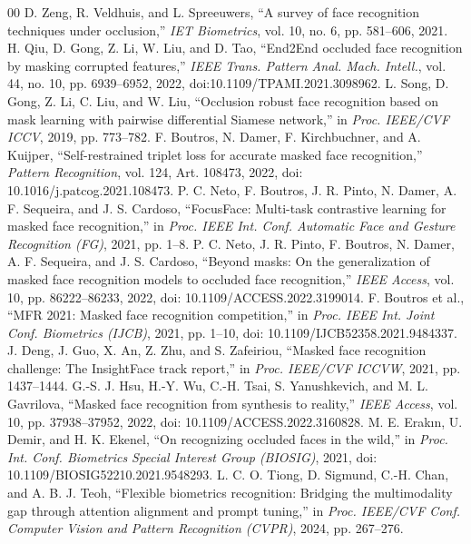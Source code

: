 \documentclass[12pt,a4paper,oneside]{report}
\begin{document}
\begin{thebibliography}{00}
 D. Zeng, R. Veldhuis, and L. Spreeuwers, ``A survey of face recognition techniques under occlusion,'' \textit{IET Biometrics}, vol. 10, no. 6, pp. 581--606, 2021.
 H. Qiu, D. Gong, Z. Li, W. Liu, and D. Tao, ``End2End occluded face recognition by masking corrupted features,'' \textit{IEEE Trans. Pattern Anal. Mach. Intell.}, vol. 44, no. 10, pp. 6939--6952, 2022, doi:10.1109/TPAMI.2021.3098962.
 L. Song, D. Gong, Z. Li, C. Liu, and W. Liu, ``Occlusion robust face recognition based on mask learning with pairwise differential Siamese network,'' in \textit{Proc. IEEE/CVF ICCV}, 2019, pp. 773--782.
 F. Boutros, N. Damer, F. Kirchbuchner, and A. Kuijper, ``Self-restrained triplet loss for accurate masked face recognition,'' \textit{Pattern Recognition}, vol. 124, Art. 108473, 2022, doi: 10.1016/j.patcog.2021.108473.
 P. C. Neto, F. Boutros, J. R. Pinto, N. Damer, A. F. Sequeira, and J. S. Cardoso, ``FocusFace: Multi-task contrastive learning for masked face recognition,'' in \textit{Proc. IEEE Int. Conf. Automatic Face and Gesture Recognition (FG)}, 2021, pp. 1--8.
 P. C. Neto, J. R. Pinto, F. Boutros, N. Damer, A. F. Sequeira, and J. S. Cardoso, ``Beyond masks: On the generalization of masked face recognition models to occluded face recognition,'' \textit{IEEE Access}, vol. 10, pp. 86222--86233, 2022, doi: 10.1109/ACCESS.2022.3199014.
 F. Boutros et al., ``MFR 2021: Masked face recognition competition,'' in \textit{Proc. IEEE Int. Joint Conf. Biometrics (IJCB)}, 2021, pp. 1--10, doi: 10.1109/IJCB52358.2021.9484337.
 J. Deng, J. Guo, X. An, Z. Zhu, and S. Zafeiriou, ``Masked face recognition challenge: The InsightFace track report,'' in \textit{Proc. IEEE/CVF ICCVW}, 2021, pp. 1437--1444.
 G.-S. J. Hsu, H.-Y. Wu, C.-H. Tsai, S. Yanushkevich, and M. L. Gavrilova, ``Masked face recognition from synthesis to reality,'' \textit{IEEE Access}, vol. 10, pp. 37938--37952, 2022, doi: 10.1109/ACCESS.2022.3160828.
 M. E. Erak{\i}n, U. Demir, and H. K. Ekenel, ``On recognizing occluded faces in the wild,'' in \textit{Proc. Int. Conf. Biometrics Special Interest Group (BIOSIG)}, 2021, doi: 10.1109/BIOSIG52210.2021.9548293.
 L. C. O. Tiong, D. Sigmund, C.-H. Chan, and A. B. J. Teoh, ``Flexible biometrics recognition: Bridging the multimodality gap through attention alignment and prompt tuning,'' in \textit{Proc. IEEE/CVF Conf. Computer Vision and Pattern Recognition (CVPR)}, 2024, pp. 267--276.

\end{thebibliography}
\end{document}
